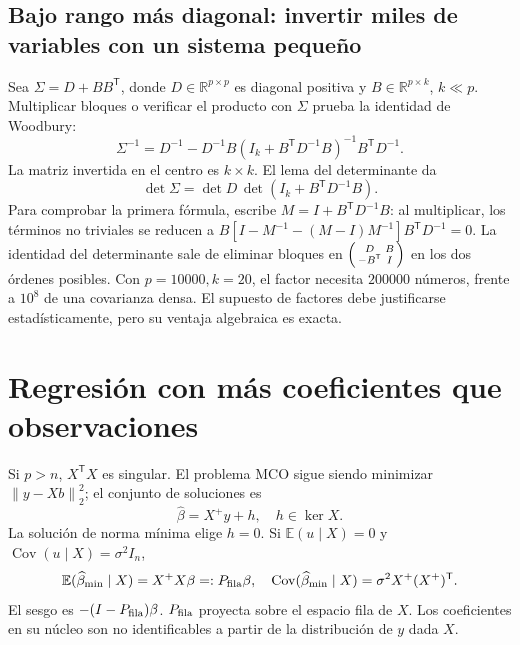 \documentclass[11pt,a4paper]{article}
\newcommand{\R}{\mathbb R}
\newcommand{\E}{\mathbb E}
\newcommand{\T}{^{\mathsf T}}
\newcommand{\norm}[1]{\left\lVert #1\right\rVert}
\DeclareMathOperator{\Cov}{Cov}
\DeclareMathOperator{\kerop}{ker}
\theoremstyle{definition}
\begin{document}
\subsection{Bajo rango más diagonal: invertir miles de variables con un sistema pequeño}
Sea $\Sigma=D+BB\T$, donde $D\in\R^{p\times p}$ es diagonal positiva y $B\in\R^{p\times k}$, $k\ll p$. Multiplicar bloques o verificar el producto con $\Sigma$ prueba la identidad de Woodbury:
\[
\boxed{\Sigma^{-1}=D^{-1}-D^{-1}B(I_k+B\T D^{-1}B)^{-1}B\T D^{-1}}.
\]
La matriz invertida en el centro es $k\times k$. El lema del determinante da
\[
\det\Sigma=\det D\,\det(I_k+B\T D^{-1}B).
\]
Para comprobar la primera fórmula, escribe $M=I+B\T D^{-1}B$: al multiplicar, los términos no triviales se reducen a $B[I-M^{-1}-(M-I)M^{-1}]B\T D^{-1}=0$. La identidad del determinante sale de eliminar bloques en $\begin{psmallmatrix}D&B\\-B\T&I\end{psmallmatrix}$ en los dos órdenes posibles.
Con $p=10000,k=20$, el factor necesita $200000$ números, frente a $10^8$ de una covarianza densa. El supuesto de factores debe justificarse estadísticamente, pero su ventaja algebraica es exacta.

\section{Regresión con más coeficientes que observaciones}
Si $p>n$, $X\T X$ es singular. El problema MCO sigue siendo minimizar $\norm{y-Xb}_2^2$; el conjunto de soluciones es
\[
\widehat\beta=X^+y+h,\quad h\in\kerop X.
\]
La solución de norma mínima elige $h=0$. Si $\E(u\mid X)=0$ y $\Cov(u\mid X)=\sigma^2I_n$,
\[
\E(\widehat\beta_{\min}\mid X)=X^+X\beta=:P_{\rm fila}\beta,
\quad\Cov(\widehat\beta_{\min}\mid X)=\sigma^2X^+(X^+)\T.
\]
El sesgo es $-(I-P_{\rm fila})\beta$. $P_{\rm fila}$ proyecta sobre el espacio fila de $X$. Los coeficientes en su núcleo son no identificables a partir de la distribución de $y$ dada $X$.
\end{document}
